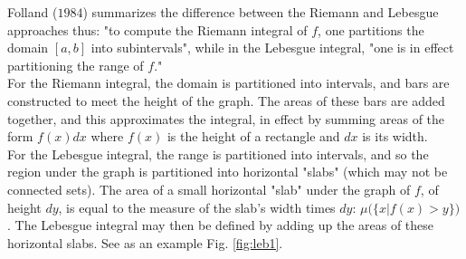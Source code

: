 Folland ($1984$) summarizes the difference between the Riemann and Lebesgue approaches thus: "to compute the Riemann integral of $f$, one partitions the domain $[a, b]$ into subintervals", while in the Lebesgue integral, "one is in effect partitioning the range of $f$." \\
For the Riemann integral, the domain is partitioned into intervals, and bars are constructed to meet the height of the graph. The areas of these bars are added together, and this approximates the integral, in effect by summing areas of the form $f(x)dx$ where $f(x)$ is the height of a rectangle and $dx$ is its width.\\
For the Lebesgue integral, the range is partitioned into intervals, and so the region under the graph is partitioned into horizontal "slabs" (which may not be connected sets). The area of a small horizontal "slab" under the graph of $f$, of height $dy$, is equal to the measure of the slab's width times $dy$: $\mu\big( \{ x \big| f(x) > y \} \big)$.
The Lebesgue integral may then be defined by adding up the areas of these horizontal slabs. See as an example Fig. \ref{fig:leb1}.

